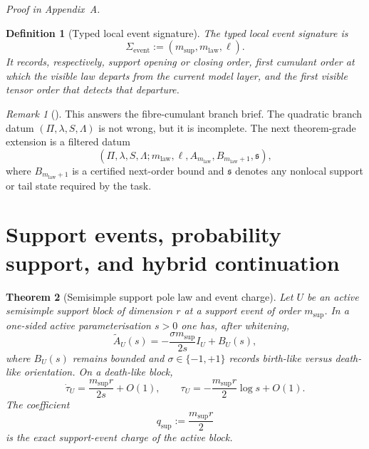 \documentclass[11pt,a4paper]{article}
\numberwithin{equation}{section}
\theoremstyle{thmcompact}
\newtheorem{theorem}{Theorem}[section]
\newtheorem{definition}[theorem]{Definition}
\theoremstyle{remark}
\newtheorem*{remarkplain}{Remark}
\newenvironment{remark}[1][]%
{\begin{remarkbox}\begin{remarkplain}[#1]\normalfont}
{\end{remarkplain}\end{remarkbox}}
\newcommand{\proofappendix}{\par{\hfill\scriptsize\emph{Proof in Appendix~A.}}\par}
\begin{document}
\proofappendix

\begin{definition}[Typed local event signature]
\label{def:event-signature}
The \emph{typed local event signature} is
\begin{equation}
\Sigma_{\mathrm{event}}:=(m_{\mathrm{sup}},m_{\mathrm{law}},\ell).
\end{equation}
It records, respectively, support opening or closing order, first cumulant order at which the visible law departs from the current model layer, and the first visible tensor order that detects that departure.
\end{definition}

\begin{remark}
This answers the fibre-cumulant branch brief. The quadratic branch datum $(\Pi,\lambda,S,\Lambda)$ is not wrong, but it is incomplete. The next theorem-grade extension is a filtered datum
\begin{equation}
(\Pi,\lambda,S,\Lambda; m_{\mathrm{law}},\ell,A_{m_{\mathrm{law}}},B_{m_{\mathrm{law}}+1},\mathfrak s),
\end{equation}
where $B_{m_{\mathrm{law}}+1}$ is a certified next-order bound and $\mathfrak s$ denotes any nonlocal support or tail state required by the task.
\end{remark}

\section{Support events, probability support, and hybrid continuation}

\begin{theorem}[Semisimple support pole law and event charge]
\label{thm:event-charge}
Let $U$ be an active semisimple support block of dimension $r$ at a support event of order $m_{\mathrm{sup}}$. In a one-sided active parameterisation $s>0$ one has, after whitening,
\begin{equation}
\widetilde A_U(s)
=-\frac{\sigma m_{\mathrm{sup}}}{2s}I_U+B_U(s),
\end{equation}
where $B_U(s)$ remains bounded and $\sigma\in\{-1,+1\}$ records birth-like versus death-like orientation. On a death-like block,
\begin{equation}
\dot\tau_U=\frac{m_{\mathrm{sup}}r}{2s}+O(1),
\qquad
\tau_U=-\frac{m_{\mathrm{sup}}r}{2}\log s+O(1).
\end{equation}
The coefficient
\begin{equation}
q_{\mathrm{sup}}:=\frac{m_{\mathrm{sup}}r}{2}
\end{equation}
is the exact support-event charge of the active block.
\end{theorem}
\end{document}
